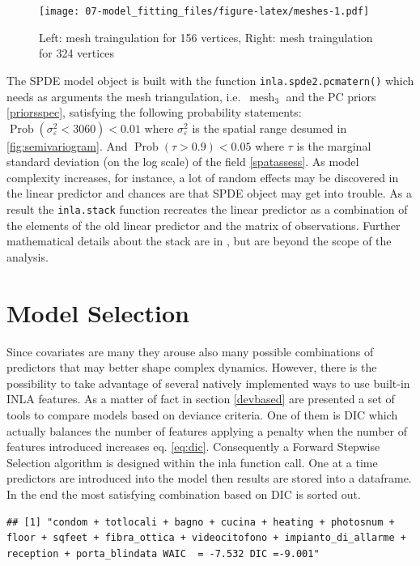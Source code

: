 \documentclass[
  12pt,
  a4paper,
  oneside]{book}
\newcommand{\passthrough}[1]{#1}
\theoremstyle{definition}
\theoremstyle{definition}
\theoremstyle{definition}
\theoremstyle{remark}
\begin{document}
\begin{figure}
\centering
\texttt{[image: 07-model\_fitting\_files/figure-latex/meshes-1.pdf]}
\caption{\label{fig:meshes}Left: mesh traingulation for 156 vertices, Right: mesh traingulation for 324 vertices}
\end{figure}

The SPDE model object is built with the function \passthrough{\lstinline!inla.spde2.pcmatern()!} which needs as arguments the mesh triangulation, i.e.~\(\operatorname{mesh}_3\) and the PC priors \ref{priorsspec}, satisfying the following probability statements: \(\operatorname{Prob}(\sigma_{\varepsilon}^2<3060)< 0.01\) where \(\sigma_{\varepsilon}^2\) is the spatial range desumed in \ref{fig:semivariogram}. And \(\operatorname{Prob}(\tau> 0.9)< 0.05\) where \(\tau\) is the marginal standard deviation (on the log scale) of the field \ref{spatassess}.
As model complexity increases, for instance, a lot of random effects may be discovered in the linear predictor and chances are that SPDE object may get into trouble. As a result the \passthrough{\lstinline!inla.stack!} function recreates the linear predictor as a combination of the elements of the old linear predictor and the matrix of observations. Further mathematical details about the stack are in \citet{Blangiardo-Cameletti}, but are beyond the scope of the analysis.

\hypertarget{model-selection}{%
\section{Model Selection}\label{model-selection}}

Since covariates are many they arouse also many possible combinations of predictors that may better shape complex dynamics. However, there is the possibility to take advantage of several natively implemented ways to use built-in INLA features. As a matter of fact in section \ref{devbased} are presented a set of tools to compare models based on deviance criteria. One of them is DIC which actually balances the number of features applying a penalty when the number of features introduced increases eq. \eqref{eq:dic}.
Consequently a Forward Stepwise Selection \citep{guyon2003introduction} algorithm is designed within the inla function call. One at a time predictors are introduced into the model then results are stored into a dataframe. In the end the most satisfying combination based on DIC is sorted out.

\begin{lstlisting}
## [1] "condom + totlocali + bagno + cucina + heating + photosnum + floor + sqfeet + fibra_ottica + videocitofono + impianto_di_allarme + reception + porta_blindata WAIC  = -7.532 DIC =-9.001"
\end{lstlisting}
\end{document}
